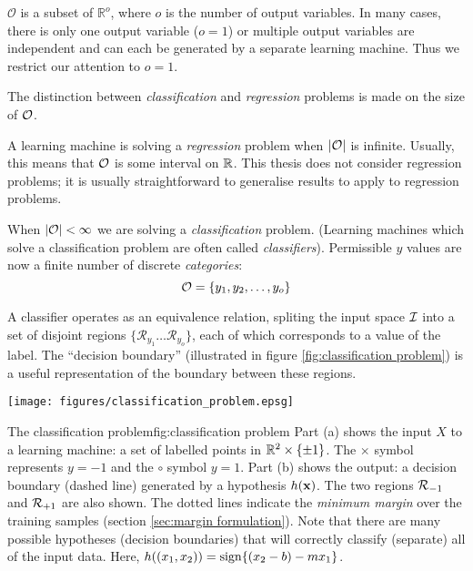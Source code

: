 $\mathcal{O}$ is a subset of $\mathbb{R}^o$, where $o$ is the number
of output variables.  In many cases, there is only one output
variable ($o=1$) or multiple output variables are independent and
can each be generated by a separate learning machine.  Thus we
restrict our attention to $o=1$.

The distinction between \emph{classification} and \emph{regression}
problems is made on the size of $\mathcal{O}$.

A learning machine is solving a \emph{regression} problem when
$|\mathcal{O}|$ is infinite.  Usually, this means that $\mathcal{O}$ is some
interval on $\mathbb{R}$.  This thesis does not consider regression
problems; it is usually straightforward to generalise results to apply
to regression problems.

When $|\mathcal{O}| < \infty$ we are solving a \emph{classification}
problem.  (Learning machines which solve a classification problem are
often called \emph{classifiers}).  Permissible $y$ values are now
a finite number of discrete \emph{categories}:
%
\begin{equation}
\mathcal{O} = \{y_1, y_2, \ldots, y_o\}
\end{equation}

A classifier operates as an equivalence relation, spliting the input
space $\mathcal{I}$ into a set of disjoint regions $\{ \mathcal{R}_{y_1}
\ldots \mathcal{R}_{y_o} \}$, each of which corresponds to a value of
the label.  The ``decision boundary'' (illustrated in figure
\ref{fig:classification problem}) is a useful representation of the
boundary between these regions.

\begin{linefigure}
\begin{center}
\texttt{[image: figures/classification\_problem.epsg]}
\end{center}
\begin{capt}{The classification problem}{fig:classification problem}
Part (a) shows the input $X$ to a learning machine: a set of
labelled points in $\mathbb{R}^2 \times \{ \pm 1 \}$.  The $\times$ symbol
represents $y=-1$ and the $\circ$ symbol $y=1$.  Part (b) shows the
output: a decision boundary (dashed line) generated by a hypothesis
$h(\mathbf{x})$.  The two regions $\mathcal{R}_{-1}$ and $\mathcal{R}_{+1}$ are also
shown.  The dotted lines indicate the \emph{minimum margin} over the
training samples (section \ref{sec:margin formulation}).  Note that
there are many possible hypotheses (decision boundaries) that will
correctly classify (separate) all of the input data.  Here, $h((x_1,
x_2)) = \mathrm{sign}\{ (x_2 - b) - m x_1 \}$.
\end{capt}
\end{linefigure}

